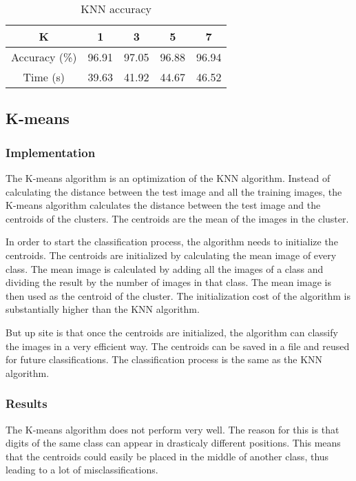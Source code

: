 \begin{center}
\begin{table}[h]
    \centering
    \begin{tabular}{|c|c|c|c|c|}
        \hline
        K & 1 & 3 & 5 & 7 \\
        \hline
        Accuracy (\%) & 96.91 & 97.05 & 96.88 & 96.94 \\
        \hline
        Time (s) & 39.63 & 41.92 & 44.67 & 46.52 \\
        \hline
    \end{tabular}
    \caption{KNN accuracy}
    \label{tab:knn}
\end{table}
\end{center}


\subsection*{K-means}
\subsubsection{Implementation}

The K-means algorithm is an optimization of the KNN algorithm. Instead of calculating the distance between the test image and all the
training images, the K-means algorithm calculates the distance between the test image and the centroids of the clusters. The centroids
are the mean of the images in the cluster.

In order to start the classification process, the algorithm needs to initialize the centroids. The centroids are initialized by calculating
the mean image of every class. The mean image is calculated by adding all the images of a class and dividing the result by the number of
images in that class. The mean image is then used as the centroid of the cluster. The initialization cost of the algorithm is substantially
higher than the KNN algorithm.

But up site is that once the centroids are initialized, the algorithm can classify the images in a very efficient way. The centroids can be
saved in a file and reused for future classifications. The classification process is the same as the KNN algorithm.

\subsubsection{Results}

The K-means algorithm does not perform very well. The reason for this is that digits of the same class can appear in drasticaly different
positions. This means that the centroids could easily be placed in the middle of another class, thus leading to a lot of misclassifications.

